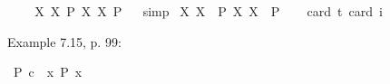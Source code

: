 \begin{isabellebody}
\isadelimproof
\ %
\endisadelimproof
%
\isatagproof
{}\isamarkupfalse%
\ %
%
\endisatagproof
{\isafoldproof}%
%
\isadelimproof
%
\endisadelimproof
\isanewline
{}\isamarkupfalse%
\ {\isachardoublequoteopen}{\isasymlfloor}{\isacharparenleft}{\isasymlambda}X{\isachardot}\ \isactrlbold {\isasymdiamond}\isactrlbold {\isasymexists}X{\isacharparenright}\ \isactrlbold {\isasymdown}{\isacharparenleft}P{\isacharcolon}{\isacharcolon}{\isasymup}{\isasymlangle}{\isasymup}{\isasymlangle}{\isasymzero}{\isasymrangle}{\isasymrangle}{\isacharparenright}\isactrlbold {\isasymrightarrow}\ {\isacharparenleft}{\isasymlambda}X{\isachardot}\ \isactrlbold {\isasymexists}X{\isacharparenright}\ \isactrlbold {\isasymdown}P{\isasymrfloor}{\isachardoublequoteclose}%
\isadelimproof
\ %
\endisadelimproof
%
\isatagproof
{}\isamarkupfalse%
\ simp%
\endisatagproof
{\isafoldproof}%
%
\isadelimproof
%
\endisadelimproof
\isanewline
{}\isamarkupfalse%
\ {\isachardoublequoteopen}{\isasymlfloor}{\isacharparenleft}{\isasymlambda}X{\isachardot}\ \isactrlbold {\isasymdiamond}\isactrlbold {\isasymexists}X{\isacharparenright}\ \ {\isacharparenleft}P{\isacharcolon}{\isacharcolon}{\isasymup}{\isasymlangle}{\isasymup}{\isasymlangle}{\isasymzero}{\isasymrangle}{\isasymrangle}{\isacharparenright}\isactrlbold {\isasymrightarrow}\ {\isacharparenleft}{\isasymlambda}X{\isachardot}\ \isactrlbold {\isasymexists}X{\isacharparenright}\ \ P{\isasymrfloor}{\isachardoublequoteclose}\ \isanewline
\ \ \isamarkupfalse%
{\isacharbrackleft}card\ {\isacharprime}t{\isacharequal}{}{\isacharcomma}\ card\ i{\isacharequal}{}{\isacharbrackright}%
\isadelimproof
\ %
\endisadelimproof
%
\isatagproof
{}\isamarkupfalse%
\ %
%
\endisatagproof
{\isafoldproof}%
%
\isadelimproof
%
\endisadelimproof
%
\begin{isamarkuptext}%
Example 7.15, p. 99:%
\end{isamarkuptext}\isamarkuptrue%
\isamarkupfalse%
\ {\isachardoublequoteopen}{\isasymlfloor}\isactrlbold {\isasymbox}{\isacharparenleft}P\ {\isacharparenleft}c{\isacharcolon}{\isacharcolon}{\isasymup}{\isasymzero}{\isacharparenright}{\isacharparenright}\ \isactrlbold {\isasymrightarrow}\ {\isacharparenleft}\isactrlbold {\isasymexists}x{\isacharcolon}{\isacharcolon}{\isasymup}{\isasymzero}{\isachardot}\ \isactrlbold {\isasymbox}{\isacharparenleft}P\ x{\isacharparenright}{\isacharparenright}{\isasymrfloor}{\isachardoublequoteclose}%

\end{isabellebody}
